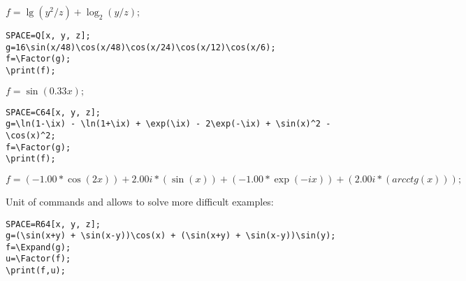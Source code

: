 
{\hspace*{4mm} $f=\lg(y^2/z)+\log_{2}(y/z);$} 

\begin{verbatim}
SPACE=Q[x, y, z]; 
g=16\sin(x/48)\cos(x/48)\cos(x/24)\cos(x/12)\cos(x/6); 
f=\Factor(g); 
\print(f);
\end{verbatim}\vspace*{-3mm}

{\hspace*{4mm} $f=\sin(0.33x);$} 
 
\begin{verbatim}
SPACE=C64[x, y, z]; 
g=\ln(1-\ix) - \ln(1+\ix) + \exp(\ix) - 2\exp(-\ix) + \sin(x)^2 - \cos(x)^2; 
f=\Factor(g); 
\print(f);
\end{verbatim}\vspace*{-3mm}

{\hspace*{4mm} $f=(-1.00*\cos(2x))+2.00 i*(\sin(x))+(-1.00*\exp(-i x))+(2.00 i*(arcctg(x)));$} 

Unit of commands  and  allows to solve more difficult examples:

\begin{verbatim}
SPACE=R64[x, y, z]; 
g=(\sin(x+y) + \sin(x-y))\cos(x) + (\sin(x+y) + \sin(x-y))\sin(y); 
f=\Expand(g);
u=\Factor(f); 
\print(f,u);
\end{verbatim}\vspace*{-3mm}

